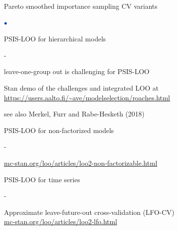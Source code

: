 \documentclass[english,t]{beamer}
\newenvironment{list1}{
   \begin{list}{$\color{list1}\bullet$}{\itemsep=6pt}}{
  \end{list}}
\newenvironment{list2}{
  \begin{list}{-}{\baselineskip=12pt\itemsep=2pt}}{
  \end{list}}
\begin{document}


  

\begin{frame}{Pareto smoothed importance sampling CV variants}

\begin{list1}
\item PSIS-LOO for hierarchical models
  \begin{list2}
  \item leave-one-group out is challenging for PSIS-LOO\\ \vspace{0.2\baselineskip}
    
  \item Stan demo of the challenges and integrated LOO at \url{https://users.aalto.fi/~ave/modelselection/roaches.html}
  \item {\small see also Merkel, Furr and Rabe-Hesketh (2018)}
  \end{list2}
  \item<2-> PSIS-LOO for non-factorized models
    \begin{list2}
    \item {\url{mc-stan.org/loo/articles/loo2-non-factorizable.html}}
    \end{list2}
  \item<3-> PSIS-LOO for time series
  \begin{list2}
  \item Approximate leave-future-out cross-validation (LFO-CV) \\ \vspace{0.2\baselineskip}
    {\url{mc-stan.org/loo/articles/loo2-lfo.html}}
  \end{list2}
\end{list1}

\end{frame}
\end{document}
